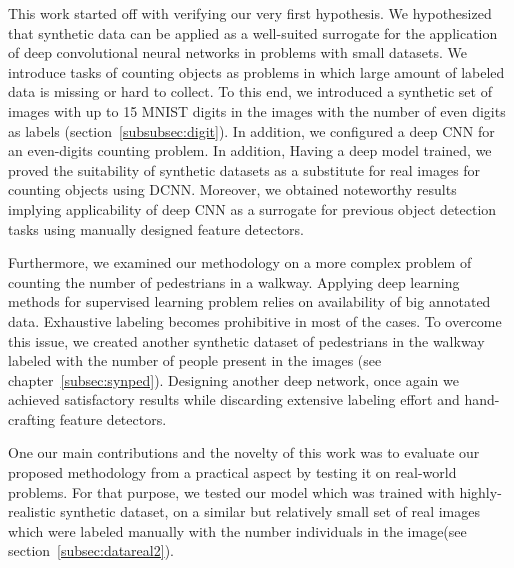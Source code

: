 This work started off with verifying our very first hypothesis. We hypothesized that synthetic data can be applied as a well-suited surrogate for the application of deep convolutional neural networks in problems with small datasets. We introduce tasks of counting objects as problems in which large amount of labeled data is missing or hard to collect. To this end, we introduced a synthetic set of images with up to 15 MNIST digits in the images with the number of even digits as labels (section~\ref{subsubsec:digit}). In addition, we configured a deep CNN for an even-digits counting problem. In addition, Having a deep model trained, we proved the suitability of synthetic datasets as a substitute for real images for counting objects using DCNN. Moreover, we obtained noteworthy results implying applicability of deep CNN as a surrogate for previous object detection tasks using manually designed feature detectors.


   

\indent Furthermore, we examined our methodology on a more complex problem of counting the number of pedestrians in a walkway. Applying deep learning methods for supervised learning problem relies on availability of big annotated data. Exhaustive labeling becomes prohibitive in most of the cases. To overcome this issue, we created another synthetic dataset of pedestrians in the walkway labeled with the number of people present in the images (see chapter~\ref{subsec:synped}). Designing another deep network, once again we achieved satisfactory results while discarding extensive labeling effort and hand-crafting feature detectors.   

\indent One our main contributions and the novelty of this work was to evaluate our proposed methodology from a practical aspect by testing it on real-world problems. For that purpose, we tested our model which was trained with highly-realistic synthetic dataset, on a similar but relatively small set of real images which were labeled manually with the number individuals in the image(see section~\ref{subsec:datareal2}).    

